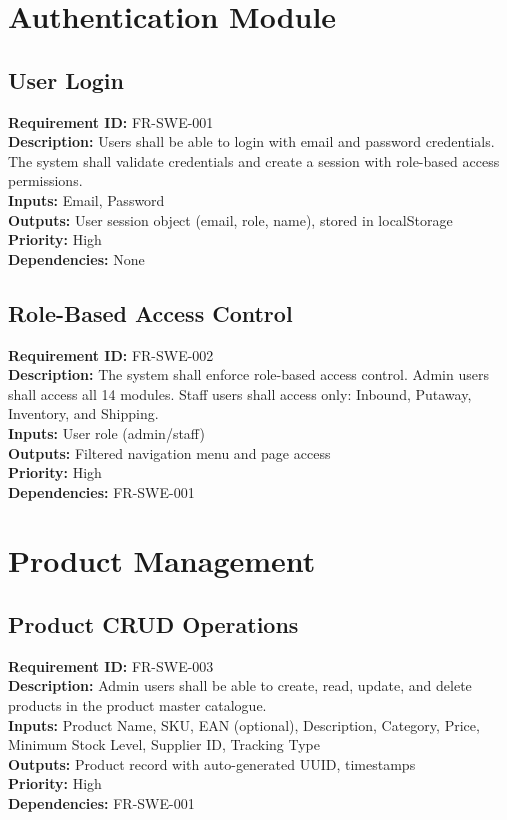 \documentclass[12pt,a4paper]{report}
\begin{document}
\section{Authentication Module}

\subsection{User Login}
\noindent\textbf{Requirement ID:} FR-SWE-001\\
\textbf{Description:} Users shall be able to login with email and password credentials. The system shall validate credentials and create a session with role-based access permissions.\\
\textbf{Inputs:} Email, Password\\
\textbf{Outputs:} User session object (email, role, name), stored in localStorage\\
\textbf{Priority:} High\\
\textbf{Dependencies:} None

\subsection{Role-Based Access Control}
\noindent\textbf{Requirement ID:} FR-SWE-002\\
\textbf{Description:} The system shall enforce role-based access control. Admin users shall access all 14 modules. Staff users shall access only: Inbound, Putaway, Inventory, and Shipping.\\
\textbf{Inputs:} User role (admin/staff)\\
\textbf{Outputs:} Filtered navigation menu and page access\\
\textbf{Priority:} High\\
\textbf{Dependencies:} FR-SWE-001

\section{Product Management}

\subsection{Product CRUD Operations}
\noindent\textbf{Requirement ID:} FR-SWE-003\\
\textbf{Description:} Admin users shall be able to create, read, update, and delete products in the product master catalogue.\\
\textbf{Inputs:} Product Name, SKU, EAN (optional), Description, Category, Price, Minimum Stock Level, Supplier ID, Tracking Type\\
\textbf{Outputs:} Product record with auto-generated UUID, timestamps\\
\textbf{Priority:} High\\
\textbf{Dependencies:} FR-SWE-001
\end{document}
